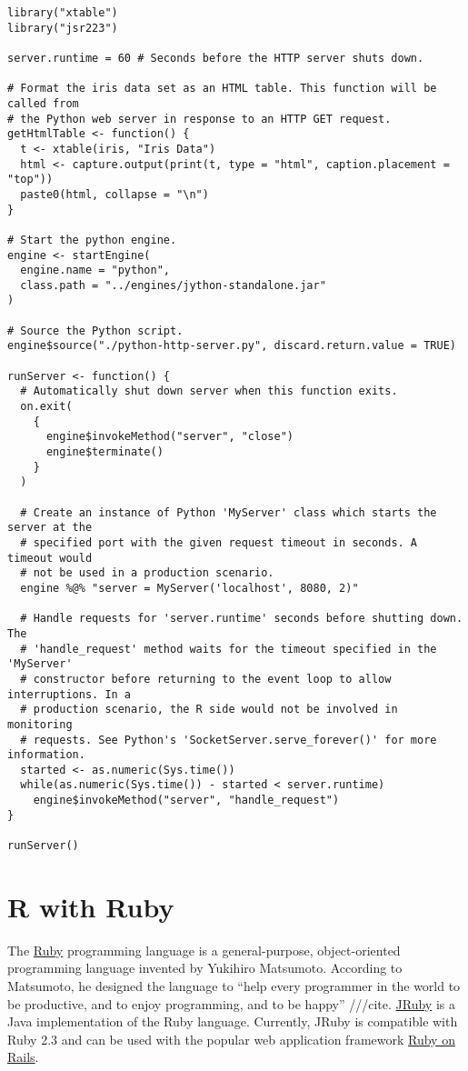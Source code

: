 \begin{verbatim}
library("xtable")
library("jsr223")

server.runtime = 60 # Seconds before the HTTP server shuts down.

# Format the iris data set as an HTML table. This function will be called from
# the Python web server in response to an HTTP GET request.
getHtmlTable <- function() {
  t <- xtable(iris, "Iris Data")
  html <- capture.output(print(t, type = "html", caption.placement = "top"))
  paste0(html, collapse = "\n")
}

# Start the python engine.
engine <- startEngine(
  engine.name = "python",
  class.path = "../engines/jython-standalone.jar"
)

# Source the Python script.
engine$source("./python-http-server.py", discard.return.value = TRUE)

runServer <- function() {
  # Automatically shut down server when this function exits.
  on.exit(
    {
      engine$invokeMethod("server", "close")
      engine$terminate()
    }
  )
  
  # Create an instance of Python 'MyServer' class which starts the server at the
  # specified port with the given request timeout in seconds. A timeout would 
  # not be used in a production scenario.
  engine %@% "server = MyServer('localhost', 8080, 2)"
  
  # Handle requests for 'server.runtime' seconds before shutting down. The 
  # 'handle_request' method waits for the timeout specified in the 'MyServer' 
  # constructor before returning to the event loop to allow interruptions. In a
  # production scenario, the R side would not be involved in monitoring 
  # requests. See Python's 'SocketServer.serve_forever()' for more information.
  started <- as.numeric(Sys.time())
  while(as.numeric(Sys.time()) - started < server.runtime)
    engine$invokeMethod("server", "handle_request")
}

runServer()
\end{verbatim}

\section{R with Ruby}

The \href{https://www.ruby-lang.org}{Ruby} programming language is a general-purpose, object-oriented programming language invented by Yukihiro Matsumoto. According to Matsumoto, he designed the language to “help every programmer in the world to be productive, and to enjoy programming, and to be happy” ///cite. \href{http://jruby.org/}{JRuby} is a Java implementation of the Ruby language. Currently, JRuby is compatible with Ruby 2.3 and can be used with the popular web application framework \href{http://rubyonrails.org/}{Ruby on Rails}.

